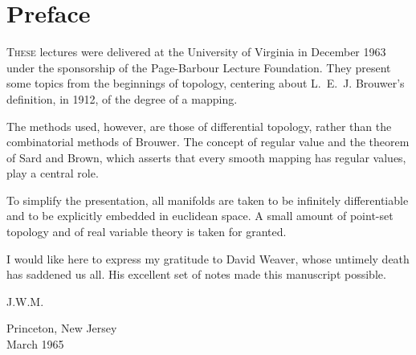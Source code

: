 
\section*{Preface}

\textsc{These} lectures were delivered at the University of Virginia in December 1963 under the sponsorship of the Page-Barbour Lecture Foundation. They present some topics from the beginnings of topology, centering about L.~E.~J. Brouwer's definition, in 1912, of the degree of a mapping.

The methods used, however, are those of differential topology, rather than the combinatorial methods of Brouwer. The concept of regular value and the theorem of Sard and Brown, which asserts that every smooth mapping has regular values, play a central role.

To simplify the presentation, all manifolds are taken to be infinitely differentiable and to be explicitly embedded in euclidean space. A small amount of point-set topology and of real variable theory is taken for granted.

I would like here to express my gratitude to David Weaver, whose untimely death has saddened us all. His excellent set of notes made this manuscript possible.

\hfill J.W.M.

Princeton, New Jersey\\
March 1965





